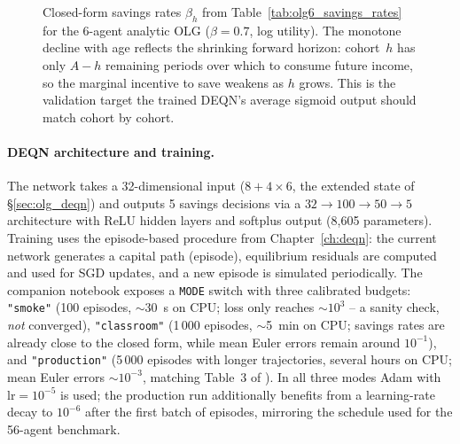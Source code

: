 \documentclass[11pt,a4paper]{report}
\begin{document}
\begin{figure}[ht]
\centering
{}
\caption{Closed-form savings rates $\beta_h$ from Table~\ref{tab:olg6_savings_rates} for the 6-agent analytic OLG ($\beta=0.7$, log utility).  The monotone decline with age reflects the shrinking forward horizon: cohort~$h$ has only $A-h$ remaining periods over which to consume future income, so the marginal incentive to save weakens as $h$ grows.  This is the validation target the trained DEQN's average sigmoid output should match cohort by cohort.}
\label{fig:olg6_savings}
\end{figure}

\paragraph{DEQN architecture and training.}
The network takes a 32-dimensional input ($8 + 4 \times 6$, the extended state of \S\ref{sec:olg_deqn}) and outputs 5 savings decisions via a $32 \to 100 \to 50 \to 5$ architecture with ReLU hidden layers and softplus output (8,605 parameters).  Training uses the episode-based procedure from Chapter~\ref{ch:deqn}: the current network generates a capital path (episode), equilibrium residuals are computed and used for SGD updates, and a new episode is simulated periodically.  The companion notebook exposes a \texttt{MODE} switch with three calibrated budgets: \texttt{"smoke"} (100 episodes, $\sim$30~s on CPU; loss only reaches $\sim 10^{3}$ -- a sanity check, \emph{not} converged), \texttt{"classroom"} (1\,000 episodes, $\sim$5~min on CPU; savings rates are already close to the closed form, while mean Euler errors remain around $10^{-1}$), and \texttt{"production"} (5\,000 episodes with longer trajectories, several hours on CPU; mean Euler errors $\sim 10^{-3}$, matching Table~3 of \citet{azinovicDEEPEQUILIBRIUMNETS2022}).  In all three modes Adam with $\textrm{lr} = 10^{-5}$ is used; the production run additionally benefits from a learning-rate decay to $10^{-6}$ after the first batch of episodes, mirroring the schedule used for the 56-agent benchmark.
\end{document}
